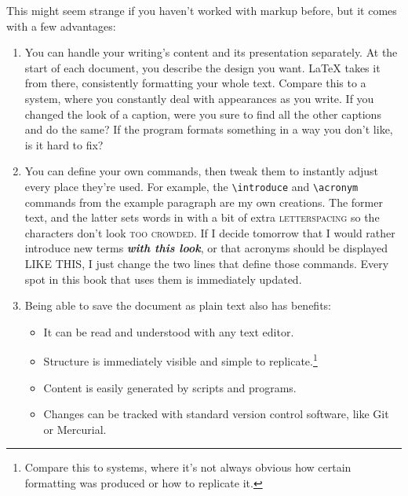 This might seem strange if you haven't worked with markup before,
but it comes with a few advantages:
\begin{enumerate}
\item You can handle your writing's content and its presentation separately.
    At the start of each document,
    you describe the design you want.
    \LaTeX{} takes it from there, consistently formatting your whole text.
    Compare this to a  system,
    where you constantly deal with appearances
    as you write.
    If you changed the look of a caption,
    were you sure to find all the other captions and do the
    same?
    If the program formats something in a way you don't like,
    is it hard to fix?%

\item You can define your own commands, then tweak them to instantly adjust
    every place they're used.
    For example, the \verb|\introduce| and \verb|\acronym| commands
    from the example paragraph are my own creations.
    The former  text, and the latter sets words in
     with a bit of extra
    \mbox{\textsc{letterspacing}} so the characters
    don't look \textsc{too crowded}.
    If I decide tomorrow that I would rather introduce new terms
    \textbf{\itshape with this look}, or that acronyms should be displayed
    {\small{} LIKE THIS},
    I just change the two lines that define those commands.
    Every spot in this book that uses them is immediately updated.

\item Being able to save the document as plain text also has benefits:
    \begin{itemize}
    \item It can be read and understood with any text editor.
    \item Structure is immediately visible
        and simple to replicate.\punckern\footnote{Compare this to
         systems, where it's not always obvious
        how certain formatting was produced or how to replicate it.}
    \item Content is easily generated by scripts and programs.
    \item Changes can be tracked with standard version control software,
        like Git or Mercurial.
    \end{itemize}
\end{enumerate}

